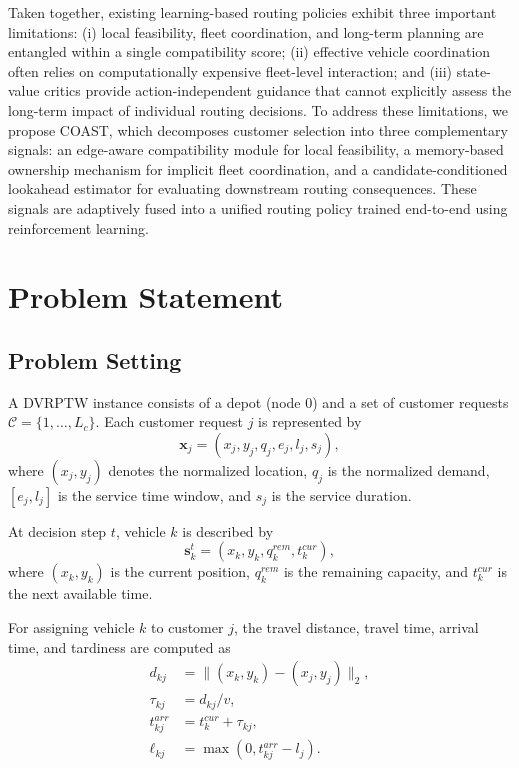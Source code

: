 \documentclass[conference]{IEEEtran}
\begin{document}
Taken together, existing learning-based routing policies exhibit three important limitations: (i) local feasibility, fleet coordination, and long-term planning are entangled within a single compatibility score; (ii) effective vehicle coordination often relies on computationally expensive fleet-level interaction; and (iii) state-value critics provide action-independent guidance that cannot explicitly assess the long-term impact of individual routing decisions. To address these limitations, we propose COAST, which decomposes customer selection into three complementary signals: an edge-aware compatibility module for local feasibility, a memory-based ownership mechanism for implicit fleet coordination, and a candidate-conditioned lookahead estimator for evaluating downstream routing consequences. These signals are adaptively fused into a unified routing policy trained end-to-end using reinforcement learning.
\section{Problem Statement}
\label{sec:prob}

\subsection{Problem Setting}
\label{sec:prob_setting}

A DVRPTW instance consists of a depot (node $0$) and a set of customer requests
$\mathcal{C}=\{1,\ldots,L_c\}$. Each customer request $j$ is represented by
\[
\mathbf{x}_j=(x_j,y_j,q_j,e_j,l_j,s_j),
\]
where $(x_j,y_j)$ denotes the normalized location, $q_j$ is the normalized demand,
$[e_j,l_j]$ is the service time window, and $s_j$ is the service duration.

At decision step $t$, vehicle $k$ is described by
\[
\mathbf{s}_k^t=(x_k,y_k,q_k^{rem},t_k^{cur}),
\]
where $(x_k,y_k)$ is the current position, $q_k^{rem}$ is the remaining capacity,
and $t_k^{cur}$ is the next available time.

For assigning vehicle $k$ to customer $j$, the travel distance, travel time,
arrival time, and tardiness are computed as
\begin{align}
d_{kj} &= \|(x_k,y_k)-(x_j,y_j)\|_2,\\
\tau_{kj} &= d_{kj}/v,\\
t^{arr}_{kj} &= t_k^{cur}+\tau_{kj},\\
\ell_{kj} &= \max(0,t^{arr}_{kj}-l_j).
\end{align}
\end{document}
